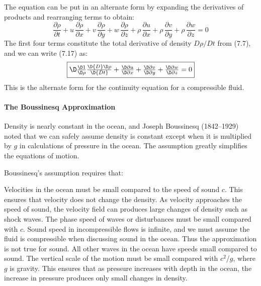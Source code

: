 The equation can be put in an alternate form by expanding the derivatives of
products and rearranging terms to obtain:
\begin{displaymath}
\frac{\partial{\rho}}{\partial{t}} + u\,\frac{\partial{\rho}}{\partial{x}} + v\,\frac{\partial{\rho}}{\partial{y}} + w\,\frac{\partial{\rho}}{\partial{z}} +
\rho\,\frac{\partial{u}}{\partial{x}} + \rho\,\frac{\partial{v}}{\partial{y}} + \rho\,\frac{\partial{w}}{\partial{z}} = 0
\end{displaymath}
The first four terms constitute the total derivative of density $D\rho/Dt$ from (7.7), and we can write (7.17) as:
\begin{equation}
\fbox{$\D
\frac{\D1}{\D\rho}\frac{\D{D}\D\rho}{\D{Dt}} + \frac{\D\partial{u}}{\D\partial{x}} + \frac{\D\partial{v}}{\D\partial{y}} + \frac{\D\partial{w}}{\D\partial{z}} =
0
$}\end{equation}
This is the alternate form for the continuity equation for a compressible fluid.

\paragraph{The Boussinesq Approximation}
Density is nearly constant in the
ocean, and Joseph Boussinesq (1842--1929) noted that we can safely
assume density is constant except when it is multiplied by $g$ in
calculations of pressure in the ocean. The assumption greatly
simplifies the equations of motion.

Boussinesq's assumption requires that:
\begin{enumerate}
\vitem Velocities in the ocean must be small compared to the speed of
sound
$c$. This ensures that velocity does not change the density. As velocity
approaches the speed of sound, the velocity field can produces large changes of
density such as shock waves.
\vitem The phase speed of waves or disturbances must be small compared with $c$.
Sound speed in incompressible flows is infinite, and
we must assume the fluid is compressible when discussing sound in the ocean. Thus the
approximation is not true for sound. All other waves in the ocean have speeds small compared
to sound.
\vitem The vertical scale of the motion must be small compared with $c^2$/$g$,
where $g$ is gravity. This ensures that as pressure increases with depth in the
ocean, the increase in pressure produces only small changes in density.
\end{enumerate}

